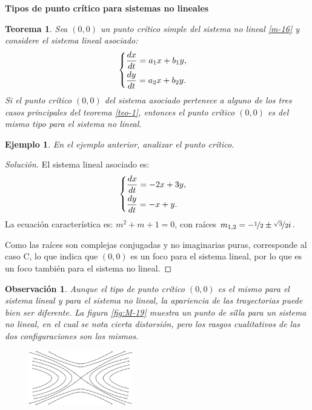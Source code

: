 \documentclass[a5paper,doc,10pt,noapacite]{apa6}
\newtheorem{teorema}{Teorema}
\newtheorem{observ}{Observación}
\newtheorem{ejem}{Ejemplo}
\newcommand{\neodefi}[1]{%
	\vspace{1\baselineskip}
	\textbf{\small#1} \newline
}
\begin{document}
{{\newpage

\neodefi{Tipos de punto crítico para sistemas no lineales}

\begin{teorema}\label{teo-6}
	Sea \((0,0)\) un punto crítico simple del sistema no lineal \eqref{m-16} y considere el sistema lineal asociado:
	\[
		\begin{cases}
			\dfrac{dx}{dt}=a_1 x + b_1 y,	\vspace{0.3em}
			\\
			\dfrac{dy}{dt}= a_2 x + b_2 y.
		\end{cases}
	\]
	Si el punto crítico \((0,0)\) del sistema asociado pertenece a alguno de los tres casos principales del  teorema \eqref{teo-1}, entonces el punto crítico \((0,0)\) es del mismo tipo para el sistema no lineal.
\end{teorema}

\begin{ejem}
	En el ejemplo anterior, analizar el punto crítico.
\end{ejem}
\begin{proof}[Solución]
	El sistema lineal asociado es:
	\[
		\begin{cases}
			\dfrac{dx}{dt}=-2 x + 3 y,	\vspace{0.3em}
			\\
			\dfrac{dy}{dt}=  {-x} +  y.
		\end{cases}
	\]
	La ecuación característica es: \(m^2+m+1=0\), con raíces \(m_{1,2}=-\nicefrac{1}{2}\pm\nicefrac{\sqrt{3}}{2}i\).
	
	Como las raíces son complejas conjugadas y no imaginarias puras, corresponde al caso C, lo que indica que \((0,0)\) es un foco para el sistema lineal, por lo que es un foco también para el sistema no lineal.
\end{proof}

\begin{observ}
	Aunque el tipo de punto crítico \((0,0)\) es el mismo para el sistema lineal y para el sistema no lineal, la apariencia de las trayectorias puede bien ser diferente. La figura \ref{fig:M-19} muestra un punto de silla para un sistema no lineal, en el cual se nota cierta distorsión, pero los rasgos cualitativos de las dos configuraciones son los mismos.
	
	\vspace{-1\baselineskip}
	\begin{figure}[H]
		\captionsetup{justification=centering, labelfont=footnotesize, font=footnotesize}
		\centering
		\includegraphics[width=4.5cm]{Graficos/figura19}
	

\end{figure}
\end{observ}}}
\end{document}
